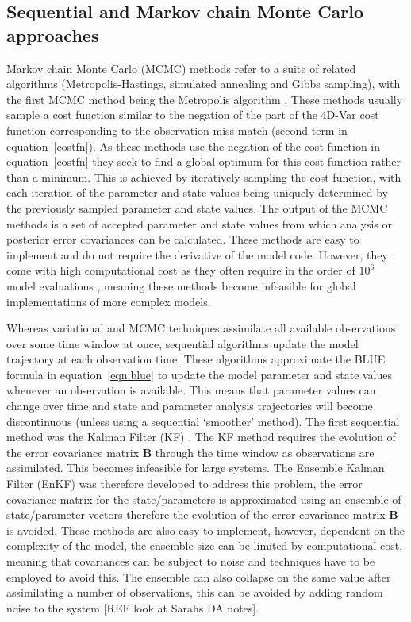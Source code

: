 \documentclass[12pt]{article}
\begin{document}
\subsection{Sequential and Markov chain Monte Carlo approaches}

Markov chain Monte Carlo (MCMC) methods refer to a suite of related algorithms (Metropolis-Hastings, simulated annealing and Gibbs sampling), with the first MCMC method being the Metropolis algorithm \citep{metropolis1953equation}. These methods usually sample a cost function similar to the negation of the part of the 4D-Var cost function corresponding to the observation miss-match (second term in equation~\eqref{costfn}). As these methods use the negation of the cost function in equation~\eqref{costfn} they seek to find a global optimum for this cost function rather than a minimum. This is achieved by iteratively sampling the cost function, with each iteration of the parameter and state values being uniquely determined by the previously sampled parameter and state values. The output of the MCMC methods is a set of accepted parameter and state values from which analysis or posterior error covariances can be calculated. These methods are easy to implement and do not require the derivative of the model code. However, they come with high computational cost as they often require in the order of \(10^{6}\) model evaluations \citep{zobitz2011primer}, meaning these methods become infeasible for global implementations of more complex models. 

Whereas variational and MCMC techniques assimilate all available observations over some time window at once, sequential algorithms update the model trajectory at each observation time. These algorithms approximate the BLUE formula in equation~\eqref{eqn:blue} to update the model parameter and state values whenever an observation is available. This means that parameter values can change over time and state and parameter analysis trajectories will become discontinuous (unless using a sequential `smoother' method). The first sequential method was the Kalman Filter (KF) \citep{kalman1960}. The KF method requires the evolution of the error covariance matrix \textbf{B} through the time window as observations are assimilated. This becomes infeasible for large systems. The Ensemble Kalman Filter (EnKF) \citep{Evensen2003} was therefore developed to address this problem, the error covariance matrix for the state/parameters is approximated using an ensemble of state/parameter vectors therefore the evolution of the error covariance matrix \textbf{B} is avoided. These methods are also easy to implement, however, dependent on the complexity of the model, the ensemble size can be limited by computational cost, meaning that covariances can be subject to noise and techniques have to be employed to avoid this. The ensemble can also collapse on the same value after assimilating a number of observations, this can be avoided by adding random noise to the system [REF look at Sarahs DA notes]. 
\end{document}
